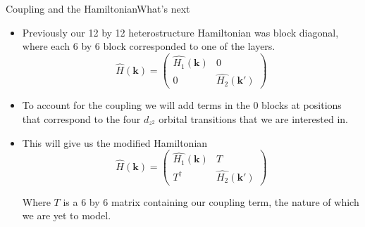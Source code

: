 \documentclass[9pt]{beamer}
\begin{document}
\begin{frame}{Coupling and the Hamiltonian}{What's next}
  \begin{itemize}
    \item{Previously our 12 by 12 heterostructure Hamiltonian was block diagonal, where each 6 by 6 block corresponded to one of the layers.
      \begin{equation}
        \hat{H}(\boldsymbol{k})=\left(\begin{array}{cc}
          \hat{H_1}(\boldsymbol{k}) & 0\\
          0 & \hat{H_2}(\boldsymbol{k'})
        \end{array}\right)
      \end{equation}
      }

    \item To account for the coupling we will add terms in the 0 blocks at positions that correspond to the four $d_{z^2}$ orbital transitions that we are interested in.

    \item{This will give us the modified Hamiltonian
      \begin{equation}
        \hat{H}(\boldsymbol{k})=\left(\begin{array}{cc}
          \hat{H_1}(\boldsymbol{k}) & T\\
          T^{\dagger} & \hat{H_2}(\boldsymbol{k'})
        \end{array}\right)
      \end{equation}

      Where $T$ is a 6 by 6 matrix containing our coupling term, the nature of which we are yet to model.
      }
  \end{itemize}
\end{frame}
\end{document}
